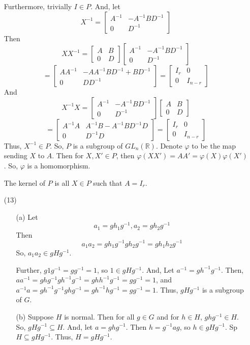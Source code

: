 \begin{itemize}
Furthermore, trivially $I \in P$. And, let
$$X^{-1} = \begin{bmatrix}
A^{-1} & -A^{-1}BD^{-1}\\
0 & D^{-1}
\end{bmatrix}$$
Then
$$XX^{-1} = \begin{bmatrix}
A & B \\
0 & D
\end{bmatrix}\begin{bmatrix}
A^{-1} & -A^{-1}BD^{-1}\\
0 & D^{-1}
\end{bmatrix}$$
$$= \begin{bmatrix}
AA^{-1} & -AA^{-1}BD^{-1} + BD^{-1} \\
0 & DD^{-1} 
\end{bmatrix} = \begin{bmatrix}
I_r & 0 \\
0 & I_{n-r}
\end{bmatrix}$$
And
$$X^{-1}X = \begin{bmatrix}
A^{-1} & -A^{-1}BD^{-1}\\
0 & D^{-1}
\end{bmatrix}\begin{bmatrix}
A & B \\
0 & D
\end{bmatrix}$$
$$= \begin{bmatrix}
A^{-1}A & A^{-1}B - A^{-1}BD^{-1}D \\
0 & D^{-1}D
\end{bmatrix} = \begin{bmatrix}
I_r & 0 \\
0 & I_{n-r}
\end{bmatrix}$$
Thus, $X^{-1} \in P$. So, $P$ is a subgroup of $GL_n(\mathbb{R})$.
Denote $\varphi$ to be the map sending $X$ to $A$. Then for $X, X' \in P$, then $\varphi(XX') = AA' = \varphi(X)\varphi(X')$. So, $\varphi$ is a homomorphism.

The kernel of $P$ is all $X \in P$ such that $A = I_r$.
\item[(13)]
\begin{itemize}
\item[(a)]
Let
$$a_1 = gh_1g^{-1}, a_2 = gh_2g^{-1}$$
Then
$$a_1a_2 = gh_1g^{-1}gh_2g^{-1} = gh_1h_2g^{-1}$$
So, $a_1a_2 \in gHg^{-1}$. 

Further, $g1g^{-1} = gg^{-1} = 1$, so $1 \in gHg^{-1}$. And, Let $a^{-1} = gh^{-1}g^{-1}$. Then, $aa^{-1} = ghg^{-1}gh^{-1}g^{-1} = ghh^{-1}g^{-1} = gg^{-1} = 1$, and $a^{-1}a = gh^{-1}g^{-1}ghg^{-1} = gh^{-1}hg^{-1} = gg^{-1} = 1$. Thus, $gHg^{-1}$ is a subgroup of $G$.
\item[(b)]
Suppose $H$ is normal. Then for all $g \in G$ and for $h \in H$, $ghg^{-1} \in H$. So, $gHg^{-1} \subseteq H$. And, let $a = ghg^{-1}$. Then $h = g^{-1}ag$, so $h \in gHg^{-1}$. Sp $H \subseteq gHg^{-1}$. Thus, $H = gHg^{-1}$.


\end{itemize}
\end{itemize}
